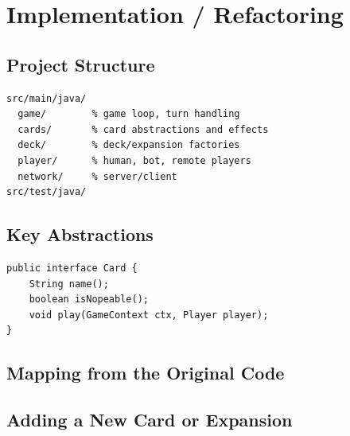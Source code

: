 \section{Implementation / Refactoring}
\label{sec:implementation}

\subsection{Project Structure}

\begin{lstlisting}[language={},caption={Package structure.},label={lst:packages}]
src/main/java/
  game/        % game loop, turn handling
  cards/       % card abstractions and effects
  deck/        % deck/expansion factories
  player/      % human, bot, remote players
  network/     % server/client
src/test/java/
\end{lstlisting}

\subsection{Key Abstractions}

\begin{lstlisting}[caption={Example card abstraction.},label={lst:card}]
public interface Card {
    String name();
    boolean isNopeable();
    void play(GameContext ctx, Player player);
}
\end{lstlisting}

\subsection{Mapping from the Original Code}

\subsection{Adding a New Card or Expansion}
